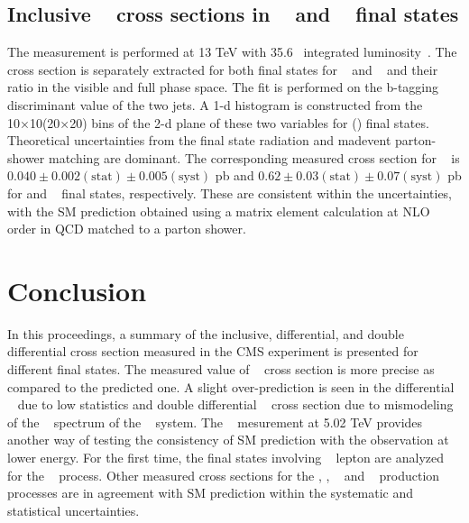 \subsection{Inclusive \ttbb~ cross sections in \ljets~ and \dilep~ final states}
The measurement is performed at 13 TeV with 35.6\fbinv~ integrated luminosity~\cite{CMS:2020grm}. 
The cross section is separately extracted for both final states for \ttbar~ and \ttjj~ and their ratio
in the visible and full phase space. The fit is performed on the b-tagging discriminant value of 
the two jets. A 1-d histogram is constructed from the 10×10(20×20) bins of the 2-d plane of these 
two variables for \ljets (\dilep) final states. Theoretical uncertainties from the final state
radiation and madevent parton-shower matching are dominant. The corresponding measured cross
section for \ttbb~ is $0.040 \pm 0.002 (\text{stat}) \pm 0.005 (\text{syst})$ pb and 
$0.62 \pm 0.03 (\text{stat}) \pm 0.07 (\text{syst})$ pb for \ljets and \dilep~ final states, 
respectively. These are consistent within the uncertainties, with the SM prediction obtained using 
a matrix element calculation at NLO order in QCD matched to a parton shower.

\section{Conclusion}
In this proceedings, a summary of the inclusive, differential, and double differential cross section
measured in the CMS experiment is presented for different final states. The measured value of 
\ttbar~ cross section is more precise as compared to the predicted one. A slight over-prediction
is seen in the differential \ttgamma~ due to low statistics and double differential \ttbar~ cross 
section due to mismodeling of the \pt~ spectrum of the \ttbar~ system. The \ttbar~ mesurement at
5.02 TeV provides another way of testing the consistency of SM prediction with the observation
at lower energy. For the first time, the final states involving \PQtau~ lepton are analyzed for the
\ttbar~ process. Other measured cross sections for the \PQt\PW, \ttgamma, \ttcc~ and \ttbb~ 
production processes are in agreement with SM prediction within the systematic and statistical 
uncertainties.


